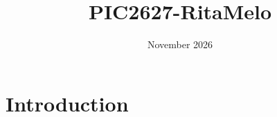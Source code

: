 \documentclass{article}
\title{PIC2627-RitaMelo}
\author{}
\date{November 2026}
\begin{document}
\maketitle

\section{Introduction}
\end{document}
